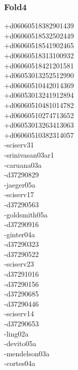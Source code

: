 \begin{multicols}{4}
\subsubsection*{Fold4}
+d06060518382901439\\
+d06060518532502449\\
+d06060518541902465\\
+d06060518313100932\\
+d06060518421201581\\
+d06053013252512990\\
+d06060510442014369\\
+d06053013241912894\\
+d06060510481014782\\
+d06060510274713652\\
+d06053013263413063\\
+d06060510382314057\\
-sciserv31\\
-srinivasan03ar1\\
-caruana03a\\
-d37290829\\
-jaeger05a\\
-sciserv17\\
-d37290563\\
-goldsmith05a\\
-d37290916\\
-ginter04a\\
-d37290323\\
-d37290522\\
-sciserv23\\
-d37291016\\
-d37290156\\
-d37290685\\
-d37290446\\
-sciserv14\\
-d37290653\\
-ling02a\\
-devito05a\\
-mendelson03a\\
-cortes04a\\

\end{multicols}
